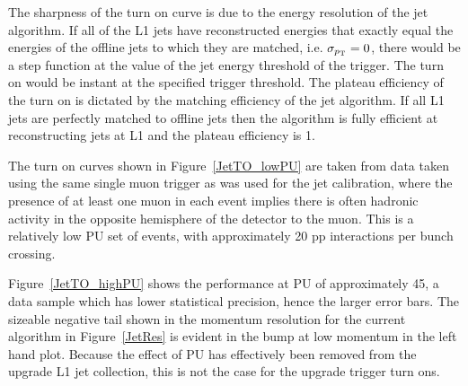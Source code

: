The sharpness of the turn on curve is due to the energy resolution of the jet algorithm.
If all of the \ac{L1} jets have reconstructed energies that exactly equal the energies of the offline jets to which they are matched,
i.e. $\sigma_{p_{\text{T}}} = 0$, there would be a step function at the value of the jet energy threshold of the trigger.
The turn on would be instant at the specified trigger threshold.
%
The plateau efficiency of the turn on is dictated by the matching efficiency of the jet algorithm.
If all \ac{L1} jets are perfectly matched to offline jets then the algorithm is fully efficient at reconstructing jets at \ac{L1} and the plateau efficiency is 1.

The turn on curves shown in Figure~\ref{JetTO_lowPU} are taken from data taken using the same single muon trigger as was used for the jet calibration, where the presence of at least one muon in each event implies there is often hadronic activity in the opposite hemisphere of the detector to the muon. 
This is a relatively low \ac{PU} set of events, with approximately 20 pp interactions per bunch crossing. 

Figure~\ref{JetTO_highPU} shows the performance at \ac{PU} of approximately 45, a data sample which has lower statistical precision, hence the larger error bars.
The sizeable negative tail shown in the momentum resolution for the current algorithm in Figure~\ref{JetRes} is 
evident in the bump at low momentum in the left hand plot.
Because the effect of \ac{PU} has effectively been removed from the upgrade \ac{L1} jet collection, this is not the case for the upgrade trigger turn ons. 



